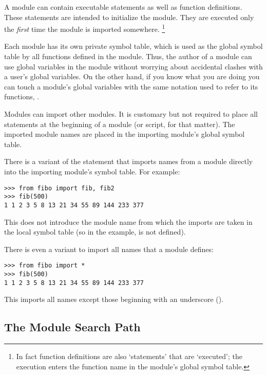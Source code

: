 \documentclass{manual}
\begin{document}
A module can contain executable statements as well as function
definitions.
These statements are intended to initialize the module.
They are executed only the
\emph{first}
time the module is imported somewhere.%
\footnote{
        In fact function definitions are also `statements' that are
        `executed'; the execution enters the function name in the
        module's global symbol table.
}

Each module has its own private symbol table, which is used as the
global symbol table by all functions defined in the module.
Thus, the author of a module can use global variables in the module
without worrying about accidental clashes with a user's global
variables.
On the other hand, if you know what you are doing you can touch a
module's global variables with the same notation used to refer to its
functions,
.

Modules can import other modules.
It is customary but not required to place all
statements at the beginning of a module (or script, for that matter).
The imported module names are placed in the importing module's global
symbol table.

There is a variant of the
statement that imports names from a module directly into the importing
module's symbol table.
For example:

\begin{verbatim}
>>> from fibo import fib, fib2
>>> fib(500)
1 1 2 3 5 8 13 21 34 55 89 144 233 377
\end{verbatim}

This does not introduce the module name from which the imports are taken
in the local symbol table (so in the example,  is not
defined).

There is even a variant to import all names that a module defines:

\begin{verbatim}
>>> from fibo import *
>>> fib(500)
1 1 2 3 5 8 13 21 34 55 89 144 233 377
\end{verbatim}

This imports all names except those beginning with an underscore
(\code{_}).

\subsection{The Module Search Path \label{searchPath}}

\end{document}
